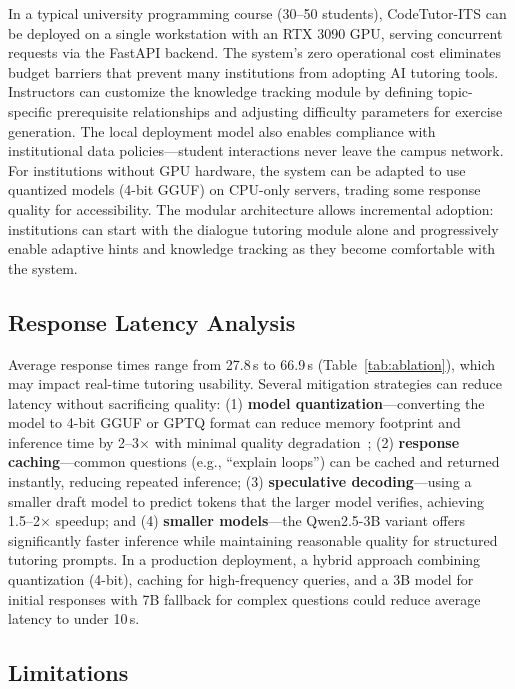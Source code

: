 \documentclass[applsci,article,submit,pdftex,moreauthors]{Definitions/mdpi}
\begin{document}
In a typical university programming course (30--50 students), CodeTutor-ITS can be deployed on a single workstation with an RTX 3090 GPU, serving concurrent requests via the FastAPI backend. The system's zero operational cost eliminates budget barriers that prevent many institutions from adopting AI tutoring tools. Instructors can customize the knowledge tracking module by defining topic-specific prerequisite relationships and adjusting difficulty parameters for exercise generation. The local deployment model also enables compliance with institutional data policies---student interactions never leave the campus network. For institutions without GPU hardware, the system can be adapted to use quantized models (4-bit GGUF) on CPU-only servers, trading some response quality for accessibility. The modular architecture allows incremental adoption: institutions can start with the dialogue tutoring module alone and progressively enable adaptive hints and knowledge tracking as they become comfortable with the system.

\subsection{Response Latency Analysis}

Average response times range from 27.8\,s to 66.9\,s (Table~\ref{tab:ablation}), which may impact real-time tutoring usability. Several mitigation strategies can reduce latency without sacrificing quality: (1) \textbf{model quantization}---converting the model to 4-bit GGUF or GPTQ format can reduce memory footprint and inference time by 2--3$\times$ with minimal quality degradation~\cite{ref36}; (2) \textbf{response caching}---common questions (e.g., ``explain loops'') can be cached and returned instantly, reducing repeated inference; (3) \textbf{speculative decoding}---using a smaller draft model to predict tokens that the larger model verifies, achieving 1.5--2$\times$ speedup; and (4) \textbf{smaller models}---the Qwen2.5-3B variant offers significantly faster inference while maintaining reasonable quality for structured tutoring prompts. In a production deployment, a hybrid approach combining quantization (4-bit), caching for high-frequency queries, and a 3B model for initial responses with 7B fallback for complex questions could reduce average latency to under 10\,s.

\subsection{Limitations}
\end{document}
